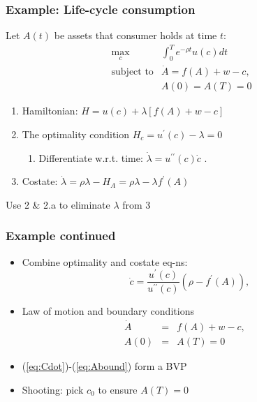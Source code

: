 \documentclass[bigger,handout]{beamer}
\newenvironment{stepitemize}{\begin{itemize}[<+->]}{\end{itemize} }
\begin{document}
\begin{frame}%
 
\frametitle{Example: Life-cycle consumption}

Let $A(t)$ be assets that consumer holds at time $t$:%
\begin{equation*}
\begin{array}{rc}
\max_{c} & \int_{0}^{T}e^{-\rho t}u(c)dt \\ 
\text{subject to} & \dot{A}=f(A)+w-c, \\ 
& A(0)=A(T)=0%
\end{array}%
\end{equation*}

\begin{enumerate}
\item Hamiltonian: $H=u(c)+\lambda \left[ f(A)+w-c\right] $

\item The optimality condition $H_{c}=u^{\prime }(c)-\lambda =0$

\begin{enumerate}
\item Differentiate w.r.t. time: $\dot{\lambda}=u^{\prime \prime }(c)\dot{c}$%
.
\end{enumerate}

\item Costate: $\dot{\lambda}=\rho \lambda -H_{A}=\rho \lambda -\lambda
f^{\prime }\left( A\right) $
\end{enumerate}

Use 2 \& 2.a to eliminate $\lambda $ from 3

 
 
\end{frame}%
 
 
 
\begin{frame}%
 
\frametitle{Example continued}

\begin{stepitemize}
\item Combine optimality and costate eq-ns: 
\begin{equation}
\dot{c}=\frac{u^{\prime }(c)}{u^{\prime \prime }(c)}\left( \rho -f^{\prime
}(A)\right) ,  \label{eq:Cdot}
\end{equation}

\item Law of motion and boundary conditions%
\begin{eqnarray}
\dot{A} &=&f(A)+w-c,\quad  \label{eq:Adot} \\
A(0) &=&A(T)=0  \label{eq:Abound}
\end{eqnarray}

\item (\ref{eq:Cdot})-(\ref{eq:Abound}) form a BVP

\item Shooting: pick $c_{0}$ to ensure $A(T)=0$
\end{stepitemize}

 
 
\end{frame}%
 
\end{document}
